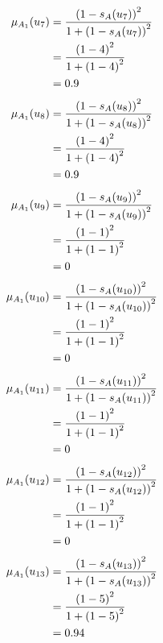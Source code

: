 \documentclass[a4paper]{book}
\begin{document}
				\begin{align}
					\mu_{A_1}(u_7) &= \frac{\left(1-s_A(u_7)\right)^2}{1 + \left(1-s_A(u_7)\right)^2}\\
					&= \frac{\left(1-4\right)^2}{1 + \left(1-4\right)^2} \notag \\
					&= 0.9 \notag
				\end{align}
				\begin{align}
					\mu_{A_1}(u_8) &= \frac{\left(1-s_A(u_8)\right)^2}{1 + \left(1-s_A(u_8)\right)^2}\\
					&= \frac{\left(1-4\right)^2}{1 + \left(1-4\right)^2} \notag \\
					&= 0.9 \notag
				\end{align}
				\begin{align}
					\mu_{A_1}(u_9) &= \frac{\left(1-s_A(u_9)\right)^2}{1 + \left(1-s_A(u_9)\right)^2}\\
					&= \frac{\left(1-1\right)^2}{1 + \left(1-1\right)^2} \notag \\
					&= 0 \notag
				\end{align}
				\begin{align}
					\mu_{A_1}(u_{10}) &= \frac{\left(1-s_A(u_{10})\right)^2}{1 + \left(1-s_A(u_{10})\right)^2}\\
					&= \frac{\left(1-1\right)^2}{1 + \left(1-1\right)^2} \notag \\
					&= 0 \notag
				\end{align}
				\begin{align}
					\mu_{A_1}(u_{11}) &= \frac{\left(1-s_A(u_{11})\right)^2}{1 + \left(1-s_A(u_{11})\right)^2}\\
					&= \frac{\left(1-1\right)^2}{1 + \left(1-1\right)^2} \notag \\
					&= 0 \notag
				\end{align}
				\begin{align}
					\mu_{A_1}(u_{12}) &= \frac{\left(1-s_A(u_{12})\right)^2}{1 + \left(1-s_A(u_{12})\right)^2}\\
					&= \frac{\left(1-1\right)^2}{1 + \left(1-1\right)^2} \notag \\
					&= 0 \notag
				\end{align}
				\begin{align}
					\mu_{A_1}(u_{13}) &= \frac{\left(1-s_A(u_{13})\right)^2}{1 + \left(1-s_A(u_{13})\right)^2}\\
					&= \frac{\left(1-5\right)^2}{1 + \left(1-5\right)^2} \notag \\
					&= 0.94 \notag
				\end{align}
\end{document}
